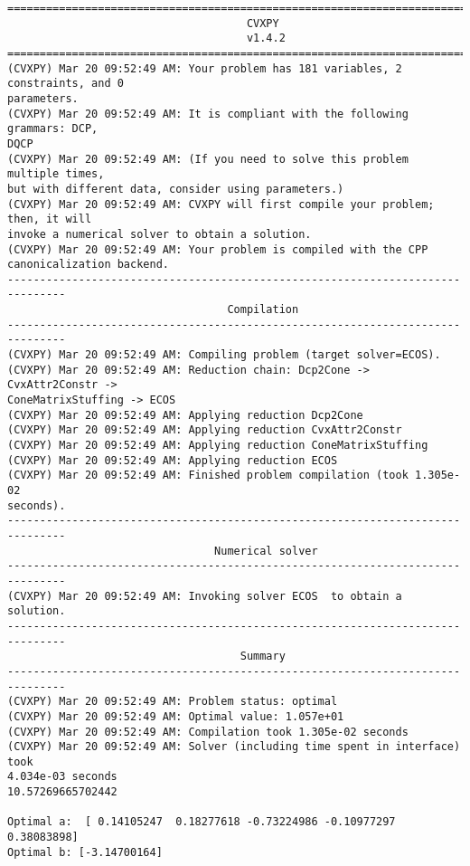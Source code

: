\documentclass[11pt]{article}
\begin{document}
    \begin{Verbatim}[commandchars=\\\{\}]
===============================================================================
                                     CVXPY
                                     v1.4.2
===============================================================================
(CVXPY) Mar 20 09:52:49 AM: Your problem has 181 variables, 2 constraints, and 0
parameters.
(CVXPY) Mar 20 09:52:49 AM: It is compliant with the following grammars: DCP,
DQCP
(CVXPY) Mar 20 09:52:49 AM: (If you need to solve this problem multiple times,
but with different data, consider using parameters.)
(CVXPY) Mar 20 09:52:49 AM: CVXPY will first compile your problem; then, it will
invoke a numerical solver to obtain a solution.
(CVXPY) Mar 20 09:52:49 AM: Your problem is compiled with the CPP
canonicalization backend.
-------------------------------------------------------------------------------
                                  Compilation
-------------------------------------------------------------------------------
(CVXPY) Mar 20 09:52:49 AM: Compiling problem (target solver=ECOS).
(CVXPY) Mar 20 09:52:49 AM: Reduction chain: Dcp2Cone -> CvxAttr2Constr ->
ConeMatrixStuffing -> ECOS
(CVXPY) Mar 20 09:52:49 AM: Applying reduction Dcp2Cone
(CVXPY) Mar 20 09:52:49 AM: Applying reduction CvxAttr2Constr
(CVXPY) Mar 20 09:52:49 AM: Applying reduction ConeMatrixStuffing
(CVXPY) Mar 20 09:52:49 AM: Applying reduction ECOS
(CVXPY) Mar 20 09:52:49 AM: Finished problem compilation (took 1.305e-02
seconds).
-------------------------------------------------------------------------------
                                Numerical solver
-------------------------------------------------------------------------------
(CVXPY) Mar 20 09:52:49 AM: Invoking solver ECOS  to obtain a solution.
-------------------------------------------------------------------------------
                                    Summary
-------------------------------------------------------------------------------
(CVXPY) Mar 20 09:52:49 AM: Problem status: optimal
(CVXPY) Mar 20 09:52:49 AM: Optimal value: 1.057e+01
(CVXPY) Mar 20 09:52:49 AM: Compilation took 1.305e-02 seconds
(CVXPY) Mar 20 09:52:49 AM: Solver (including time spent in interface) took
4.034e-03 seconds
10.57269665702442

Optimal a:  [ 0.14105247  0.18277618 -0.73224986 -0.10977297  0.38083898]
Optimal b: [-3.14700164]
    \end{Verbatim}
\end{document}

